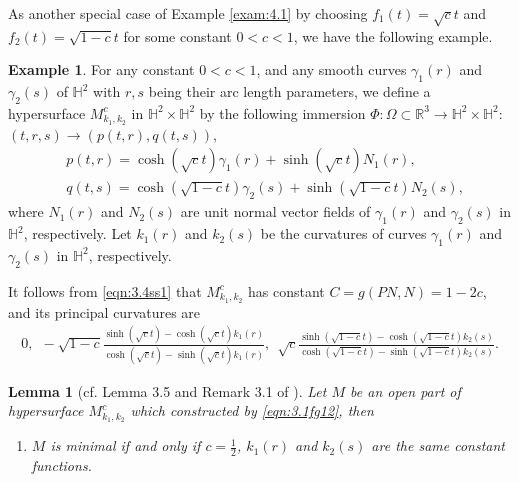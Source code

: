 \documentclass[reqno]{amsart}%
\newtheorem{lemma}[theorem]{Lemma}
\theoremstyle{definition}
\newtheorem{example}[theorem]{Example}
\numberwithin{equation}{section}
\begin{document}


As another special case of Example \ref{exam:4.1} by choosing $f_1(t)=\sqrt{c}t$ and $f_2(t)=\sqrt{1-c}t$
for some constant $0<c<1$, we have the following example.
\begin{example}\label{exam:3.4fg1}
For any constant $0<c<1$, and any smooth curves $\gamma_1(r)$ and $\gamma_2(s)$
of $\mathbb{H}^2$ with $r,s$ being their arc length parameters, we define a hypersurface $M_{k_1,k_2}^c$ in
$\mathbb{H}^2\times\mathbb{H}^2$ by the following immersion
$\Phi:\Omega\subset\mathbb{R}^3\rightarrow\mathbb{H}^2\times\mathbb{H}^2$:
$(t,r,s)\rightarrow(p(t,r),q(t,s))$,
%
\begin{equation}\label{eqn:3.1fg12}
\begin{aligned}
&p(t,r)=\cosh(\sqrt{c}t)\gamma_1(r)+\sinh(\sqrt{c}t)N_1(r),\\
&q(t,s)=\cosh(\sqrt{1-c}t)\gamma_2(s)+\sinh(\sqrt{1-c}t)N_2(s),
\end{aligned}	
\end{equation}
%
where $N_1(r)$ and $N_2(s)$ are unit normal vector fields of $\gamma_1(r)$ and
$\gamma_2(s)$ in $\mathbb{H}^2$, respectively.
Let $k_1(r)$ and $k_2(s)$ be the curvatures of
curves $\gamma_1(r)$ and $\gamma_2(s)$ in $\mathbb{H}^2$, respectively.

It follows from \eqref{eqn:3.4ss1} that $M_{k_1,k_2}^c$ has constant
$C=g(PN,N)=1-2c$,
and its principal curvatures are
$$
\begin{aligned}
0,\ \ -\sqrt{1-c}\frac{\sinh(\sqrt{c}t)-\cosh(\sqrt{c}t)k_1(r)}
{\cosh(\sqrt{c}t)-\sinh(\sqrt{c}t)k_1(r)},\ \
\sqrt{c}\frac{\sinh(\sqrt{1-c}t)-\cosh(\sqrt{1-c}t)k_2(s)}
{\cosh(\sqrt{1-c}t)-\sinh(\sqrt{1-c}t)k_2(s)}.
\end{aligned}
$$

\begin{lemma}[cf. Lemma 3.5 and Remark 3.1 of \cite{GMY}]\label{lemma:3.5fg12}
Let $M$ be an open part of hypersurface $M_{k_1,k_2}^c$ which constructed by
\eqref{eqn:3.1fg12}, then
%
\begin{enumerate}
\item[(1)]
$M$ is minimal if and only if $c=\frac{1}{2}$, $k_1(r)$ and $k_2(s)$
are the same constant functions.


\end{enumerate}
\end{lemma}
\end{example}
\end{document}
